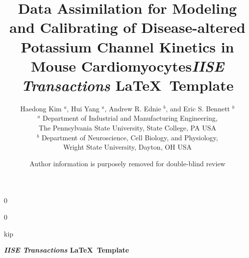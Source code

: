 \documentclass[11pt]{article}
\newcommand{\blind}{0}
\begin{document}
	
	\def\spacingset#1{\renewcommand{\baselinestretch}%
		{#1}\small\normalsize} \spacingset{1}
	
	\blind
	{
		\title{\bf Data Assimilation for Modeling and Calibrating of Disease-altered Potassium Channel Kinetics in Mouse Cardiomyocytes}
		\author{Haedong Kim $^a$, Hui Yang $^a$, Andrew R. Ednie $^b$, and Eric S. Bennett $^b$ \\
		$^a$ Department of Industrial and Manufacturing Engineering, \\
		The Pennsylvania State University, State College, PA USA \\
        $^b$ Department of Neuroscience, Cell Biology, and Physiology, \\
        Wright State University, Dayton, OH USA}
		\date{}
		\maketitle
	} \fi
	
	\blind
	{
        \title{\bf \emph{IISE Transactions} \LaTeX \ Template}
		\author{Author information is purposely removed for double-blind review}
		
\bigskip
		\bigskip
		\bigs   kip
		\begin{center}
			{\LARGE\bf \emph{IISE Transactions} \LaTeX \ Template}
		\end{center}
		\medskip
	} \fi
	\bigskip
		
\end{document}
